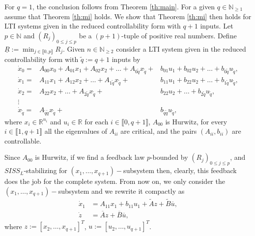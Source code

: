 \documentclass[letterpaper, 10pt]{article}
\newcommand{\reels}{\mathbb{R}}
\newcommand{\entiers}{\mathbb{N}}
\begin{document}
For $q=1$, the conclusion follows from Theorem \ref{th:main}. For a given $q \in \entiers_{\geq 1}$ assume that Theorem \ref{th:mi} holds. We show that Theorem \ref{th:mi} then holds for LTI systems given in the reduced controllability form with $q+1$ inputs. Let $p \in \entiers$ and $(R_j)_{0 \leq j \leq p}$ be a $(p+1)$-tuple of positive real numbers. Define $\underline{R}:= \min_{j \in \llbracket 0, p \rrbracket} R_j$. Given $n \in \entiers_{\geq 2}$ consider a LTI system given in the reduced controllability form with $\tilde{q}:=q+1$ inputs by
\begin{equation*}
\begin{array}{rrr}
\dot{x}_0     =  &  A_{00} x_0  +   A_{01}x_1 +  A_{02}x_2 + \ldots +  A_{0\tilde{q}} x_{\tilde{q}} +  & b_{01} u_1 +  b_{02} u_2 + \ldots +  b_{0\tilde{q}} u_{\tilde{q}} ,  \\
\dot{x}_1     =  &                  A_{11}x_1 +  A_{12}x_2 +  \ldots +  A_{1\tilde{q}} x_{\tilde{q}} + & b_{11} u_1 +  b_{22} u_2 + \ldots +  b_{1\tilde{q}} u_{\tilde{q}}  ,  \\
\dot{x}_2     =  &                               A_{22}x_2 +  \ldots +  A_{2\tilde{q}} x_{\tilde{q}} + &               b_{22} u_2 + \ldots +  b_{2\tilde{q}} u_{\tilde{q}} ,  \\
         \vdots  &                                                                                     &                                                          \\
\dot{x}_{\tilde{q}}  = &                                         A_{\tilde{q}\tilde{q}}x_{\tilde{q}}  + &                          b_{\tilde{q} \tilde{q}}u_{\tilde{q}},  
  \end{array}
\end{equation*}
where $x_i \in \reels^{n_i}$ and $u_i \in \reels$ for each $i \in \llbracket 0, q+1 \rrbracket$, $A_{00}$ is Hurwitz, for every $i \in \llbracket 1, q+1 \rrbracket$ all the eigenvalues of $A_{ii} $ are critical, and the pairs $(A_{ii}, b_{ii})$ are controllable. 

Since $A_{00}$ is Hurwitz, if we find a  feedback law $p$-bounded by $(R_j)_{0 \leq j \leq p}$, and $SISS_L$-stabilizing for $(x_1, \ldots , x_{q+1})-$subsystem then, clearly, this feedback does the job for the complete system. From now on, we only consider the $(x_1, \ldots , x_{q+1})-$subsystem and we rewrite it compactly as 
\begin{subequations}
\label{sys:mi}
\begin{align}
\dot{x}_1 &  = A_{11} x_1 + b_{11} u_1 + \tilde{A}z+ \tilde{B}\overline{u}, \label{sys:mi:x} \\
\dot{z} & =  \overline{A} z + \overline{B} \overline{u}, \label{sys:mi:z}
\end{align}
\end{subequations} where $z:=[x_2, \ldots , x_{q+1}]^T$, $u:=[u_2 , \ldots , u_{q+1}]^T$.
\end{document}
